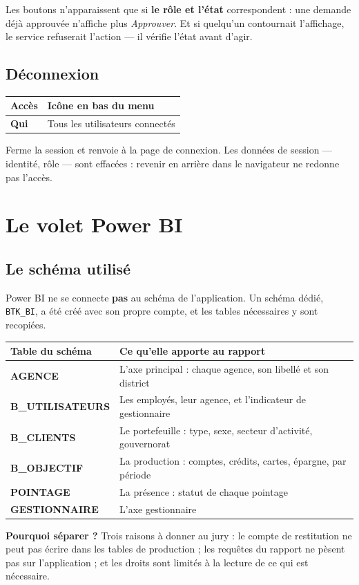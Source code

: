 \documentclass[a4paper,11pt]{article}
\newcommand{\ecran}[3]{%
  \subsection{#1}%
  \noindent\begin{tabularx}{\textwidth}{|>{\columncolor{btkpale}\bfseries}L{2.3cm}|X|}
  \hline
  \textbf{Accès} & #2\\
  \hline
  \textbf{Qui} & #3\\
  \hline
  \end{tabularx}\par\vspace{0.4em}}
\begin{document}
\begin{note}
Les boutons n'apparaissent que si \textbf{le rôle et l'état} correspondent : une
demande déjà approuvée n'affiche plus \emph{Approuver}. Et si quelqu'un
contournait l'affichage, le service refuserait l'action --- il vérifie l'état
avant d'agir.
\end{note}

\ecran{Déconnexion}{Icône en bas du menu}{Tous les utilisateurs connectés}

Ferme la session et renvoie à la page de connexion. Les données de session ---
identité, rôle --- sont effacées : revenir en arrière dans le navigateur ne
redonne pas l'accès.

\section{Le volet Power BI}

\subsection{Le schéma utilisé}

Power BI ne se connecte \textbf{pas} au schéma de l'application. Un schéma
dédié, \texttt{BTK\_BI}, a été créé avec son propre compte, et les tables
nécessaires y sont recopiées.

\noindent\begin{tabularx}{\textwidth}{|>{\bfseries}L{4cm}|X|}
\hline
\textmd{\textbf{Table du schéma}} & \textbf{Ce qu'elle apporte au rapport}\\
\hline
AGENCE & L'axe principal : chaque agence, son libellé et son district\\
\hline
B\_UTILISATEURS & Les employés, leur agence, et l'indicateur de gestionnaire\\
\hline
B\_CLIENTS & Le portefeuille : type, sexe, secteur d'activité, gouvernorat\\
\hline
B\_OBJECTIF & La production : comptes, crédits, cartes, épargne, par période\\
\hline
POINTAGE & La présence : statut de chaque pointage\\
\hline
GESTIONNAIRE & L'axe gestionnaire\\
\hline
\end{tabularx}

\vspace{0.6em}
\noindent\textbf{Pourquoi séparer ?} Trois raisons à donner au jury : le compte
de restitution ne peut pas écrire dans les tables de production ; les requêtes
du rapport ne pèsent pas sur l'application ; et les droits sont limités à la
lecture de ce qui est nécessaire.
\end{document}
